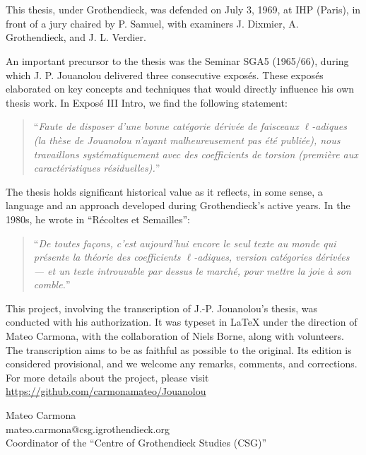 \documentclass[12pt,twoside]{report} %
\theoremstyle{plain}
\theoremstyle{definition}
\begin{document}
\section*{}

This thesis, under Grothendieck, was defended on July 3, 1969, at IHP (Paris), in front of a jury chaired by P. Samuel, with examiners J. Dixmier, A. Grothendieck, and J. L. Verdier. 

An important precursor to the thesis was the Seminar SGA5 (1965/66), during which J. P. Jouanolou delivered three consecutive exposés. These exposés elaborated on key concepts and techniques that would directly influence his own thesis work. In Exposé III Intro, we find the following statement:
\begin{quote}
    ``\emph{Faute de disposer d'une bonne catégorie dérivée de faisceaux $\ell$-adiques (la thèse de Jouanolou n'ayant malheureusement pas été publiée), nous travaillons systématiquement avec des coefficients de torsion (première aux caractéristiques résiduelles).}''
\end{quote}
The thesis holds significant historical value as it reflects, in some sense, a language and an approach developed during Grothendieck's active years. In the 1980s, he wrote in ``Récoltes et Semailles'':
\begin{quote}
    ``\emph{De toutes façons, c'est aujourd'hui encore le seul texte au monde qui présente la théorie des coefficients $\ell$-adiques, version catégories dérivées --- et un texte introuvable par dessus le marché, pour mettre la joie à son comble.}''
\end{quote}
This project, involving the transcription of J.-P. Jouanolou's thesis, was conducted with his authorization. It was typeset in \LaTeX{} under the direction of Mateo Carmona, with the collaboration of Niels Borne, along with volunteers. The transcription aims to be as faithful as possible to the original. Its edition is considered provisional, and we welcome any remarks, comments, and corrections. For more details about the project, please visit \\
\url{https://github.com/carmonamateo/Jouanolou}

\begin{flushright}
Mateo Carmona \\ 
mateo.carmona@csg.igrothendieck.org \\
Coordinator of the ``Centre of Grothendieck Studies (CSG)''
\end{flushright}
\end{document}
